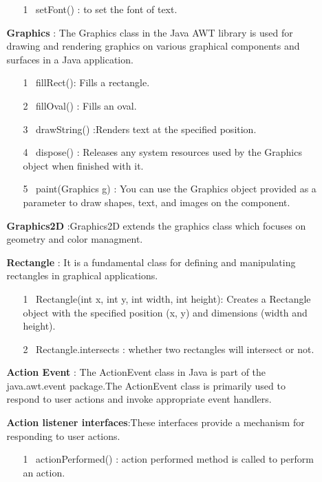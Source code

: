 \documentclass{article}
\begin{document}
\begin{enumerate}
\begin{enumerate}
        \begin{enumerate}
        \item[1]\ setFont() : to set the font of text.
         \end{enumerate}
      \item [\bullet] \textbf {Graphics} : The Graphics class in the Java AWT  library is used for drawing and rendering graphics on various graphical components and surfaces in a Java application.
       \begin{enumerate}
          \item[1]\ fillRect(): Fills a rectangle.
          \item[2]\ fillOval() : Fills an oval.
          \item[3]\ drawString() :Renders text at the specified position.
          \item[4]\ dispose() : Releases any system resources used by the Graphics object when finished with it.
          \item[5]\ paint(Graphics g) : You can use the Graphics object provided as a parameter to draw shapes, text, and images on the component.
          \end{enumerate}
     \item[\bullet] \textbf{Graphics2D} :Graphics2D extends the graphics class which focuses on geometry and color managment.
     \item[\bullet] \textbf{Rectangle} : It is a fundamental class for defining and manipulating rectangles in graphical applications. 
          \begin{enumerate}
        \item[1]\ Rectangle(int x, int y, int width, int height): Creates a Rectangle object with the specified position (x, y) and dimensions (width and height).
        \item[2]\ Rectangle.intersects : whether two rectangles will intersect or not.
        \end{enumerate}
      \item[\bullet]\textbf{Action Event }: The ActionEvent class in Java is part of the java.awt.event package.The ActionEvent class is primarily used to respond to user actions and invoke appropriate event handlers. 
    \item[\bullet]\textbf{Action listener interfaces}:These interfaces provide a mechanism for responding to user actions.
    \begin{enumerate}
      \item[1]\ actionPerformed() : action performed method is called to perform an action.
         \end{enumerate}
         

\end{enumerate}
\end{enumerate}
\end{document}

